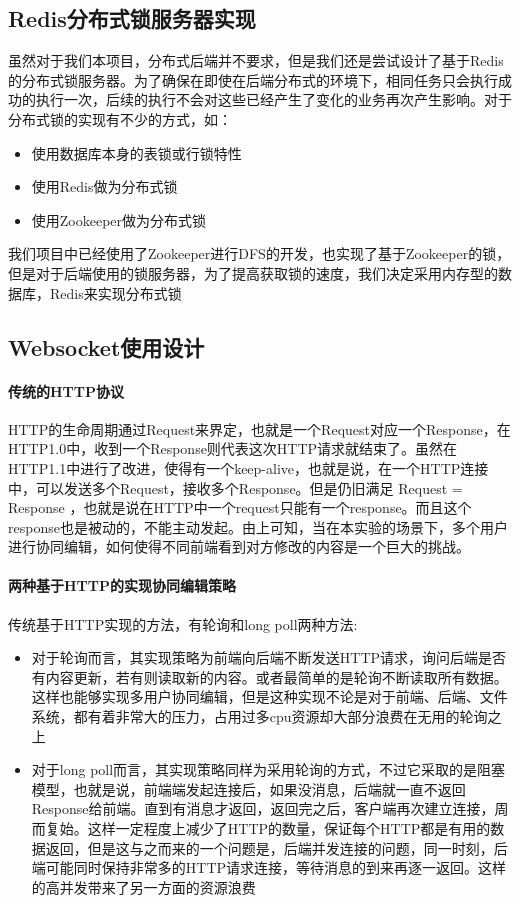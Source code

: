 \documentclass[UTF8]{ctexart}
\begin{document}
\subsection{Redis分布式锁服务器实现}
\par{虽然对于我们本项目，分布式后端并不要求，但是我们还是尝试设计了基于Redis的分布式锁服务器。为了确保在即使在后端分布式的环境下，相同任务只会执行成功的执行一次，后续的执行不会对这些已经产生了变化的业务再次产生影响。对于分布式锁的实现有不少的方式，如：}
\begin{itemize}
\item 使用数据库本身的表锁或行锁特性
\item 使用Redis做为分布式锁
\item 使用Zookeeper做为分布式锁
\end{itemize}
\par{我们项目中已经使用了Zookeeper进行DFS的开发，也实现了基于Zookeeper的锁，但是对于后端使用的锁服务器，为了提高获取锁的速度，我们决定采用内存型的数据库，Redis来实现分布式锁}
\subsection{Websocket使用设计}
\paragraph{传统的HTTP协议}
HTTP的生命周期通过Request来界定，也就是一个Request对应一个Response，在HTTP1.0中，收到一个Response则代表这次HTTP请求就结束了。虽然在HTTP1.1中进行了改进，使得有一个keep-alive，也就是说，在一个HTTP连接中，可以发送多个Request，接收多个Response。但是仍旧满足 Request = Response ，也就是说在HTTP中一个request只能有一个response。而且这个response也是被动的，不能主动发起。由上可知，当在本实验的场景下，多个用户进行协同编辑，如何使得不同前端看到对方修改的内容是一个巨大的挑战。
\paragraph{两种基于HTTP的实现协同编辑策略}
传统基于HTTP实现的方法，有轮询和long poll两种方法:
\begin{itemize}
\item 对于轮询而言，其实现策略为前端向后端不断发送HTTP请求，询问后端是否有内容更新，若有则读取新的内容。或者最简单的是轮询不断读取所有数据。这样也能够实现多用户协同编辑，但是这种实现不论是对于前端、后端、文件系统，都有着非常大的压力，占用过多cpu资源却大部分浪费在无用的轮询之上
\item 对于long poll而言，其实现策略同样为采用轮询的方式，不过它采取的是阻塞模型，也就是说，前端端发起连接后，如果没消息，后端就一直不返回Response给前端。直到有消息才返回，返回完之后，客户端再次建立连接，周而复始。这样一定程度上减少了HTTP的数量，保证每个HTTP都是有用的数据返回，但是这与之而来的一个问题是，后端并发连接的问题，同一时刻，后端可能同时保持非常多的HTTP请求连接，等待消息的到来再逐一返回。这样的高并发带来了另一方面的资源浪费
\end{itemize}
\end{document}
